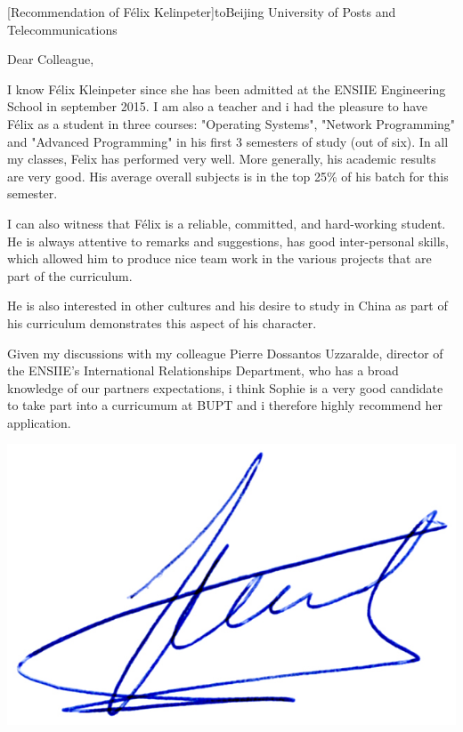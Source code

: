 \documentclass[a4paper,10pt]{article}
\begin{document}

\begin{letter}[Recommendation of Félix Kelinpeter]{to}{Beijing University of
    Posts and Telecommunications}

Dear Colleague, 

I know Félix Kleinpeter since she has been admitted at the ENSIIE Engineering
School in september  2015.  I am also a  teacher and i had the  pleasure to have
Félix  as  a   student  in  three  courses:   "Operating  Systems",  "Network
Programming" and "Advanced  Programming" in his first 3 semesters  of study (out
of  six). In  all  my  classes, Felix  has  performed  very well.  More
generally, his academic  results are very good. His average  overall subjects is
in the top 25\% of his batch for this semester.

I can also witness that Félix is  a reliable, committed, and hard-working student.
He is always attentive to remarks and suggestions, has good inter-personal
skills, which allowed him to produce nice team work in the various projects
that are part of the curriculum.

He is also interested in other cultures and his desire to  study in China as part 
of his curriculum demonstrates this aspect of his character.

Given my discussions  with my colleague Pierre Dossantos  Uzzaralde, director of
the ENSIIE's International  Relationships Department, who has  a broad knowledge
of our partners  expectations, i think Sophie  is a very good  candidate to take
part into a curricumum at BUPT and i therefore highly recommend her application.

\end{letter}
\begin{flushright}
\includegraphics[width=.26\textwidth]{signgenaud.jpg}
\end{flushright}
%
%
\end{document}
